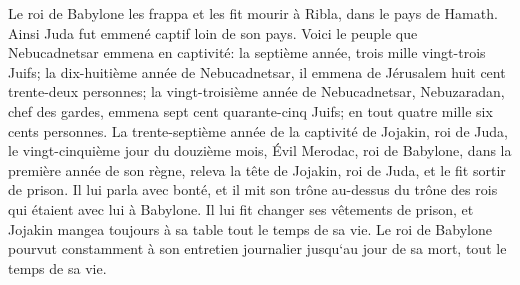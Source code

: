 \verse Le roi de Babylone les frappa et les fit mourir à Ribla, dans le pays de Hamath. Ainsi Juda fut emmené captif loin de son pays. 
\verse Voici le peuple que Nebucadnetsar emmena en captivité: la septième année, trois mille vingt-trois Juifs; 
\verse la dix-huitième année de Nebucadnetsar, il emmena de Jérusalem huit cent trente-deux personnes; 
\verse la vingt-troisième année de Nebucadnetsar, Nebuzaradan, chef des gardes, emmena sept cent quarante-cinq Juifs; en tout quatre mille six cents personnes. 
\verse La trente-septième année de la captivité de Jojakin, roi de Juda, le vingt-cinquième jour du douzième mois, Évil Merodac, roi de Babylone, dans la première année de son règne, releva la tête de Jojakin, roi de Juda, et le fit sortir de prison. 
\verse Il lui parla avec bonté, et il mit son trône au-dessus du trône des rois qui étaient avec lui à Babylone. 
\verse Il lui fit changer ses vêtements de prison, et Jojakin mangea toujours à sa table tout le temps de sa vie. 
\verse Le roi de Babylone pourvut constamment à son entretien journalier jusqu`au jour de sa mort, tout le temps de sa vie. 
